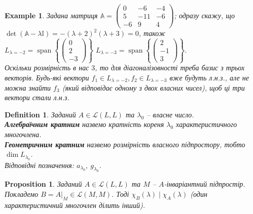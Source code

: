 \documentclass[a4paper, 10pt]{article}
\theoremstyle{theoremdd}
\newtheorem{definition}[theorem]{Definition}
\newtheorem{example}[theorem]{Example}
\newtheorem{proposition}[theorem]{Proposition}
\DeclareMathOperator{\linspan}{span}
\begin{document}
\begin{example}
\label{non_diagonalizable_because_not_enough_dim}
Задана матриця $\mathbb{A} = \begin{pmatrix}
0 & -6 & -4 \\
5 & -11 & -6 \\
-6 & 9 & 4
\end{pmatrix}$; одразу скажу, що\\
$\det (\mathbb{A} - \lambda \mathbb{I}) = -(\lambda+2)^2(\lambda+3)=0$, також\\
$L_{\lambda = -2} = \linspan \left\{ \begin{pmatrix}
0 \\ 2 \\ -3
\end{pmatrix} \right\}$ \hspace{2cm}
$L_{\lambda = -3} = \linspan \left\{ \begin{pmatrix}
2 \\ -1 \\ 3
\end{pmatrix} \right\}$.\\
Оскільки розмірність в нас $3$, то для діагоналізовності треба базис з трьох векторів. Будь-які вектори $f_1 \in L_{\lambda = -2}, f_2 \in L_{\lambda = -3}$ вже будуть л.н.з., але не можна знайти $f_3$ (який відповідає одному з двох власних чисел), щоб ці три вектори стали л.н.з.
\end{example}

\begin{definition}
Заданий $A \in \mathcal{L}(L,L)$ та $\lambda_0$ -- власне число.\\
\textbf{Алгебраїчним кратним} назвемо кратність кореня $\lambda_0$ характеристичного многочлена.\\
\textbf{Геометричним кратним} назвемо розмірність власного підпростору, тобто $\dim L_{\lambda_0}$.\\
Відповідні позначення: $a_{\lambda_0},\ g_{\lambda_0}$.
\end{definition}

\begin{proposition}
Заданий $A \in \mathcal{L}(L,L)$ та $M$ -- $A$-інваріантний підпростір. Покладемо $B = A|_{M} \in \mathcal{L}(M,M)$. Тоді $\chi_B(\lambda) \mid \chi_A(\lambda)$ (один характеристичний многочлен ділить інший).
\end{proposition}
\end{document}
